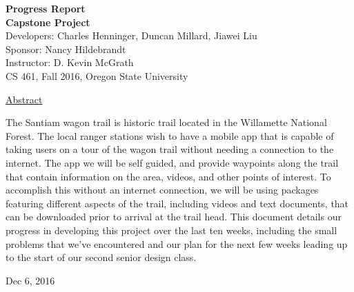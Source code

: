\documentclass[letterpaper, 10pt,titlepage]{article}
\newcommand\tab[1][1cm]{\hspace*{#1}}
\begin{document}
\begin{titlepage}
\begin{center}
    \Huge
    \textbf{Progress Report}\\
    \textbf{Capstone Project}\\
    \vspace{1.0cm}
    \large
    Developers: Charles Henninger, Duncan Millard, Jiawei Liu\\
    Sponsor: Nancy Hildebrandt\\
    \vspace{1.5cm}
    \large
    Instructor: D. Kevin McGrath\\

    \large
    CS 461, Fall 2016, Oregon State University\\    

    \vspace{3.2cm}

    \large
    \underline{Abstract}\\
    \vspace{0.3cm}
    \end{center}
    \large

    \tab The Santiam wagon trail is historic trail located in the Willamette National Forest. The local ranger stations wish to have a mobile app that is capable of taking users on a tour of the wagon trail without needing a connection to the internet. The app we will be self guided, and provide waypoints along the trail that contain information on the area, videos, and other points of interest. To accomplish this without an internet connection, we will be using packages featuring different aspects of the trail, including videos and text documents, that can be downloaded prior to arrival at the trail head. This document details our progress in developing this project over the last ten weeks, including the small problems that we’ve encountered and our plan for the next few weeks leading up to the start of our second senior design class.
    
    \vspace{0.8cm}
    \vfill
    
\begin{center}    
    Dec 6, 2016

\end{center}
\end{titlepage}
\end{document}

